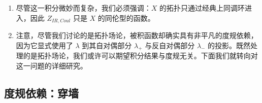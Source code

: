 \begin{enumerate}
此外，对固定的次数 $r$，$1/y^{n}$ 中的级数在 $n=r$ 处截断。若像 (7.13) 那样固定 $q^{\mu}$ 的一个幂次，则每个 $c_{\lambda}^{(n)}$ 都是 $\Sigma$ 与 $p$ 的级数，且 $r+2\ell\ge-3-8\mu$。$1/y$ 展开中的首项为 $c_{\lambda}^{(0)}(\mu)=\lambda_+c(\mu)$，其中 $c(\mu)$ 是 $p/4,\Sigma$ 的级数，其系数是 $\Gamma^{0}(4)$ 的模形式的系数，取整数值的傅里叶系数。

现在考虑 $y\to\infty$ 时尖点附近积分的定义。我们先对 $x$ 在 $0\le x\le1$ 上积分，得到 $y$ 的一个函数。这一步把对 $\lambda$ 的求和投影，使得只有第零个傅里叶系数有贡献：
\begin{equation}
2\mu=\lambda^{2}
\tag{7.15}
\end{equation}
于是剩下
\begin{equation}
\int_{y_{\mathrm{cutoff}}}^{\infty}\frac{\dd y}{y^{1/2}}
\sum_{\lambda}
e^{-2\pi y\lambda_+^{2}}
(-1)^{(\lambda-\lambda_0)\cdot w_2(X)}
\left(
\lambda_+\,c\!\left(\tfrac{1}{2}\lambda^{2}\right)
+y^{-1}c_{\lambda}^{(1)}\!\left(\tfrac{1}{2}\lambda^{2}\right)+\cdots
\right)
\tag{7.16}
\end{equation}
现在，只要不出现 $\lambda_+=0$ 的项，这一积分绝对收敛。物理上，$\lambda_+$ 所对应的解正是阿贝尔瞬子。阿贝尔瞬子带来额外的玻色零模，而出现额外玻色零模时理应预期新的发散。此外，在 $1/y$ 的级数中，即使 $\lambda_+=0$，也只有首项能导致积分发散。这一潜在的发散正是下文所讨论的穿墙的来源。
\item 尽管这一积分微妙而复杂，我们必须强调：$X$ 的拓扑只通过经典上同调环进入，因此 $Z_{IR,Coul}$ 只是 $X$ 的同伦型的函数。
\item 注意，尽管我们讨论的是拓扑场论，被积函数却确实具有非平凡的度规依赖，因为它显式使用了 $\lambda$ 到其自对偶部分 $\lambda_+$ 与反自对偶部分 $\lambda_-$ 的投影。既然处理的是拓扑场论，我们或许可以期望积分结果与度规无关。下面我们就转向对这一问题的详细研究。
\end{enumerate}

\subsection{度规依赖：穿墙}

